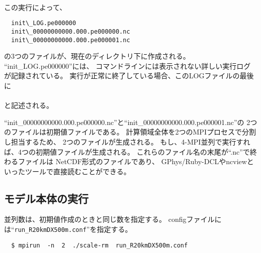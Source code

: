\\

\noindent この実行によって、\\
\begin{verbatim}
  init\_LOG.pe000000
  init\_00000000000.000.pe000000.nc
  init\_00000000000.000.pe000001.nc
\end{verbatim}
の3つのファイルが、現在のディレクトリ下に作成される。
``init\_LOG.pe000000''には、
コマンドラインには表示されない詳しい実行ログが記録されている。
実行が正常に終了している場合、このLOGファイルの最後に\\

\\

\noindent と記述される。

``init\_00000000000.000.pe000000.nc''と``init\_00000000000.000.pe000001.nc''の
2つのファイルは初期値ファイルである。
計算領域全体を2つのMPIプロセスで分割し担当するため、
2つのファイルが生成される。
もし、4-MPI並列で実行すれば、4つの初期値ファイルが生成される。
これらのファイル名の末尾が``.nc''で終わるファイルは
NetCDF形式のファイルであり、
GPhys/Ruby-DCLやncviewといったツールで直接読むことができる。


\subsection{モデル本体の実行}
並列数は、初期値作成のときと同じ数を指定する。
configファイルには``\verb|run_R20kmDX500m.conf|''を指定する。
\begin{verbatim}
  $ mpirun  -n  2  ./scale-rm  run_R20kmDX500m.conf
\end{verbatim}

